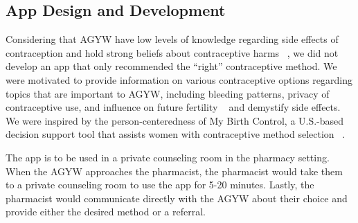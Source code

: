 \subsection{App Design and Development}
Considering that AGYW have low levels of knowledge regarding side effects of contraception and hold strong beliefs about contraceptive harms ~\cite{harrington2021spoiled, ochako2015barriers, sedlander2018they}, we did not develop an app that only recommended the ``right” contraceptive method. We were motivated to provide information on various contraceptive options regarding topics that are important to AGYW, including bleeding patterns, privacy of contraceptive use, and influence on future fertility ~\cite{harrington2023adaptation, harrington2021spoiled} and demystify side effects. We were inspired by the person-centeredness of My Birth Control, a U.S.-based decision support tool that assists women with contraceptive method selection ~\cite{dehlendorf2019cluster, holt2020patient, dehlendorf2019mixed}. 

The  app is  to be used in a private counseling room in the pharmacy setting.  When the AGYW approaches the pharmacist, the pharmacist would take them to a private counseling room to use the app for 5-20 minutes. Lastly, the pharmacist would communicate directly with the AGYW about their choice and provide either the desired method or a referral. 


